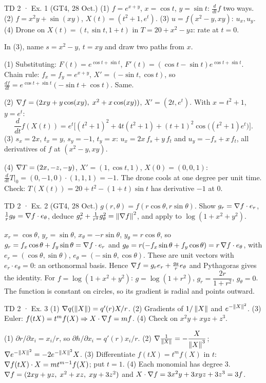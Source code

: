 \begin{problem}{TD 2 · Ex. 1 (GT4, 28 Oct.)}
(1) $f=e^{x+y}$, $x=\cos t$, $y=\sin t$: $\frac{d}{dt}f$ two ways.
(2) $f=x^2y+\sin(xy)$, $X(t)=(t^2+1,e^t)$.
(3) $u=f(x^2-y,xy)$: $u_x,u_y$.
(4) Drone on $X(t)=(t,\sin t,1+t)$ in $T=20+x^2-yz$: rate at $t=0$.
\end{problem}
\begin{hint}In (3), name $s=x^2-y$, $t=xy$ and draw two paths from $x$.\end{hint}
\begin{solution}
(1) Substituting: $F(t)=e^{\cos t+\sin t}$, $F'(t)=(\cos t-\sin t)e^{\cos t+\sin t}$. Chain rule:
$f_x=f_y=e^{x+y}$, $X'=(-\sin t,\cos t)$, so $\frac{df}{dt}=e^{\cos t+\sin t}(-\sin t+\cos t)$. Same.

(2) $\nabla f=(2xy+y\cos(xy),\;x^2+x\cos(xy))$, $X'=(2t,e^t)$. With $x=t^2+1$, $y=e^t$:
\[
\frac{d}{dt}f(X(t))=e^t\Big[(t^2+1)^2+4t(t^2+1)+(t+1)^2\cos\big((t^2+1)e^t\big)\Big].
\]
(3) $s_x=2x$, $t_x=y$, $s_y=-1$, $t_y=x$:
$u_x=2x\,f_s+y\,f_t$ and $u_y=-f_s+x\,f_t$, all derivatives of $f$ at $(x^2-y,xy)$.

(4) $\nabla T=(2x,-z,-y)$, $X'=(1,\cos t,1)$, $X(0)=(0,0,1)$:
$\frac{d}{dt}T\big|_{0}=(0,-1,0)\cdot(1,1,1)=-1$. The drone cools at one degree per unit time.
Check: $T(X(t))=20+t^2-(1+t)\sin t$ has derivative $-1$ at $0$.
\end{solution}

\begin{problem}{TD 2 · Ex. 2 (GT4, 28 Oct.)}
$g(r,\theta)=f(r\cos\theta,r\sin\theta)$. Show $g_r=\nabla f\cdot e_r$,
$\frac1rg_\theta=\nabla f\cdot e_\theta$, deduce $g_r^2+\frac1{r^2}g_\theta^2=\left\lVert \nabla f\right\rVert^2$, and
apply to $\log(1+x^2+y^2)$.
\end{problem}
\begin{solution}
$x_r=\cos\theta$, $y_r=\sin\theta$, $x_\theta=-r\sin\theta$, $y_\theta=r\cos\theta$, so
$g_r=f_x\cos\theta+f_y\sin\theta=\nabla f\cdot e_r$ and $g_\theta=r(-f_x\sin\theta+f_y\cos\theta)
=r\,\nabla f\cdot e_\theta$, with $e_r=(\cos\theta,\sin\theta)$, $e_\theta=(-\sin\theta,\cos\theta)$.
These are unit vectors with $e_r\cdot e_\theta=0$: an orthonormal basis. Hence
$\nabla f=g_re_r+\frac{g_\theta}{r}e_\theta$ and Pythagoras gives the identity.
For $f=\log(1+x^2+y^2)$: $g=\log(1+r^2)$, $g_r=\dfrac{2r}{1+r^2}$, $g_\theta=0$. The function is
constant on circles, so its gradient is radial and points outward.
\end{solution}

\begin{problem}{TD 2 · Ex. 3}
(1) $\nabla q(\left\lVert X\right\rVert)=q'(r)X/r$. (2) Gradients of $1/\left\lVert X\right\rVert$ and $e^{-\left\lVert X\right\rVert^2}$.
(3) Euler: $f(tX)=t^mf(X)\Rightarrow X\cdot\nabla f=mf$. (4) Check on $x^2y+xyz+z^3$.
\end{problem}
\begin{solution}
(1) $\partial r/\partial x_i=x_i/r$, so $\partial h/\partial x_i=q'(r)x_i/r$.
(2) $\nabla\frac1{\left\lVert X\right\rVert}=-\dfrac{X}{\left\lVert X\right\rVert^3}$; \ $\nabla e^{-\left\lVert X\right\rVert^2}=-2e^{-\left\lVert X\right\rVert^2}X$.
(3) Differentiate $f(tX)=t^mf(X)$ in $t$: $\nabla f(tX)\cdot X=mt^{m-1}f(X)$; put $t=1$.
(4) Each monomial has degree 3. $\nabla f=(2xy+yz,\;x^2+xz,\;xy+3z^2)$ and
$X\cdot\nabla f=3x^2y+3xyz+3z^3=3f$.
\end{solution}

